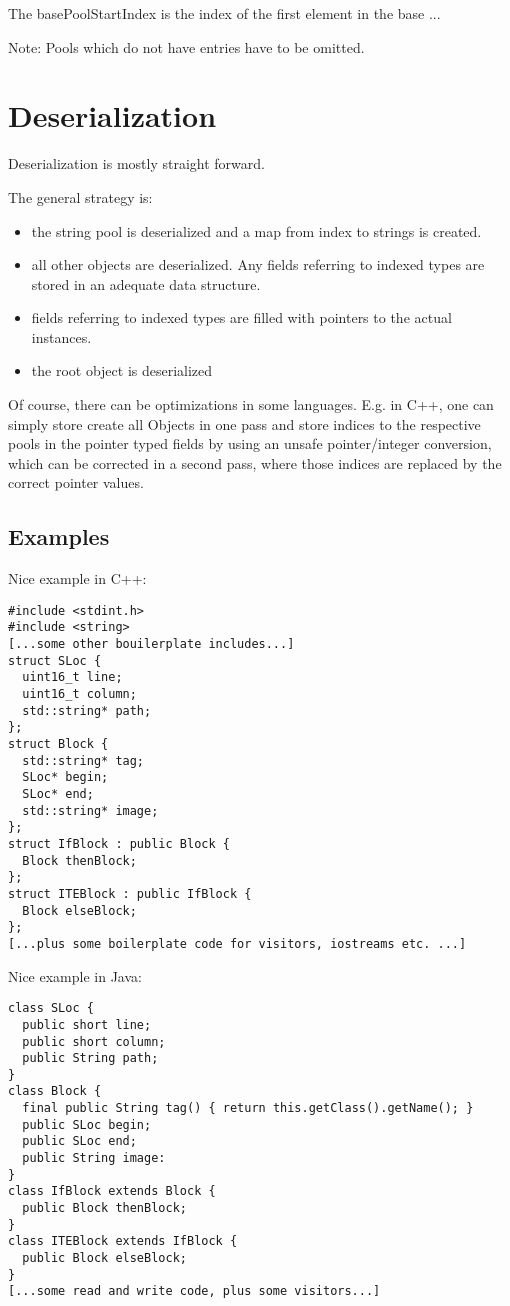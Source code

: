 \documentclass[a4paper,10pt]{article}
\begin{document}
The basePoolStartIndex is the index of the first element in the base ...


Note: Pools which do not have entries have to be omitted.

\section{Deserialization}

Deserialization is mostly straight forward.

The general strategy is:
\begin{itemize}
 \item the string pool is deserialized and a map from index to strings is created.
 \item all other objects are deserialized. Any fields referring to indexed types are stored in an adequate data structure.
 \item fields referring to indexed types are filled with pointers to the actual instances.
 \item the root object is deserialized
\end{itemize}

Of course, there can be optimizations in some languages. E.g. in C++, one can simply store create all Objects in one pass and store indices to the respective pools in the pointer typed fields by using an unsafe pointer/integer conversion, which can be corrected in a second pass, where those indices are replaced by the correct pointer values.


\subsection{Examples}

Nice example in C++:
\begin{verbatim}
#include <stdint.h>
#include <string>
[...some other bouilerplate includes...]
struct SLoc {
  uint16_t line;
  uint16_t column;
  std::string* path;
};
struct Block {
  std::string* tag;
  SLoc* begin;
  SLoc* end;
  std::string* image;
};
struct IfBlock : public Block {
  Block thenBlock;
};
struct ITEBlock : public IfBlock {
  Block elseBlock;
};
[...plus some boilerplate code for visitors, iostreams etc. ...]
\end{verbatim}


Nice example in Java:
\begin{verbatim}
class SLoc {
  public short line;
  public short column;
  public String path;
}
class Block {
  final public String tag() { return this.getClass().getName(); }
  public SLoc begin;
  public SLoc end;
  public String image:
}
class IfBlock extends Block {
  public Block thenBlock;
}
class ITEBlock extends IfBlock {
  public Block elseBlock;
}
[...some read and write code, plus some visitors...]
\end{verbatim}
\end{document}
